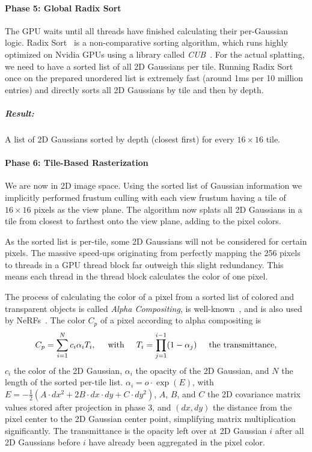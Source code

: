 \paragraph{Phase 5: Global Radix Sort} The GPU waits until all threads have finished calculating their per-Gaussian logic. Radix Sort~\cite{RadixSort2026} is a non-comparative sorting algorithm, which runs highly optimized on Nvidia GPUs using a library called \textit{CUB}~\cite{adinets2022onesweepfastersignificantdigit}.
For the actual splatting, we need to have a sorted list of all 2D Gaussians per tile. Running Radix Sort once on the prepared unordered list is extremely fast (around 1ms per 10 million entries) and directly sorts all 2D Gaussians by tile and then by depth.
\subparagraph{Result:} A list of 2D Gaussians sorted by depth (closest first) for every $16\times 16$ tile.

\paragraph{Phase 6: Tile-Based Rasterization} We are now in 2D image space. Using the sorted list of Gaussian information we implicitly performed frustum culling with each view frustum having a tile of $16\times 16$ pixels as the view plane. The algorithm now splats all 2D Gaussians in a tile from closest to farthest onto the view plane, adding to the pixel colors.

As the sorted list is per-tile, some 2D Gaussians will not be considered for certain pixels. The massive speed-ups originating from perfectly mapping the 256 pixels to threads in a GPU thread block \cite{kerbl3DGaussianSplatting2023} far outweigh this slight redundancy. This means each thread in the thread block calculates the color of one pixel. 

The process of calculating the color of a pixel from a sorted list of colored and transparent objects is called \textit{Alpha Compositing}, is well-known~\cite{porterCompositingDigitalImages1984, maxOpticalModelsDirect1995}, and is also used by NeRFs~\cite{mildenhallNeRFRepresentingScenes2020}.
The color $C_p$ of a pixel according to alpha compositing is
$$
C_p = \sum_{i=1}^{N} c_i \alpha_i T_i,
\hspace{0.5cm} \text{with} \hspace{0.5cm}
T_i = \prod_{j=1}^{i-1} (1 - \alpha_j)
\hspace{0.5cm} \text{the transmittance,}
$$
$c_i$ the color of the 2D Gaussian, $\alpha_i$ the opacity of the 2D Gaussian, and $N$ the length of the sorted per-tile list. 
$\alpha_i = o \cdot \exp(E)$, with $E = -\frac{1}{2} (A \cdot dx^2 + 2B \cdot dx \cdot dy + C \cdot dy^2)$, $A$, $B$, and $C$ the 2D covariance matrix values stored after projection in phase 3, and $(dx, dy)$ the distance from the pixel center to the 2D Gaussian center point, simplifying matrix multiplication significantly. The transmittance is the opacity left over at 2D Gaussian $i$ after all 2D Gaussians before $i$ have already been aggregated in the pixel color.

